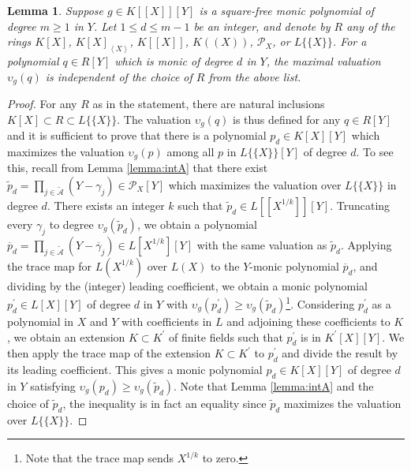\documentclass[a4paper,11pt]{amsart}%
\theoremstyle{definition}
\theoremstyle{plain}
\newtheorem{lemma}[defn]{Lemma}
\theoremstyle{remark}
\begin{document}
\begin{lemma}
\label{same exp} Suppose $g\in K[[X]][Y]$ is a square-free monic polynomial of degree
$m\geq 1$ in $Y$. Let $1\leq d \leq m-1$ be an integer, and denote by $R$ any of the rings $K[X]$,
$K[X]_{\left\langle X\right\rangle }$, $K[[X]]$, $K((X))$, ${\mathcal{P}_{X}}$, or $L\{\{X\}\}$.
For a polynomial $q\in R[Y]$ which is monic of degree $d$ in $Y$, the maximal valuation $\upsilon_{g}(q)$ is
independent of the choice of $R$ from the above list.
\end{lemma}
\begin{proof}
For any $R$ as in the statement, there are natural inclusions $K[X]\subset R \subset L\{\{X\}\}$.
The valuation $\upsilon_{g}(q)$  is thus defined for any $q\in R[Y]$ and it is sufficient to prove that
there is a polynomial $p_d\in K[X][Y]$ which maximizes the valuation $\upsilon_{g}(p)$ among all $p$ in $L\{\{X\}\}[Y]$
of degree $d$. To see this, recall from Lemma \ref{lemma:intA} that there exist 
$\widetilde{p}_d=\prod_{j\in\widetilde{\mathcal{A}}}(Y-\gamma_{j}) \in \mathcal{P}_{X}[Y]$
which maximizes the valuation over $L\{\{X\}\}$ in degree $d$. There exists an
integer $k$ such that $\widetilde{p}_d\in L[[X^{1/k}]][Y]$. Truncating every 
$\gamma_{j}$ to degree $\upsilon_{g}(\widetilde{p}_d)$, we obtain a polynomial $\overline
{p}_d = \prod_{j\in\widetilde{\mathcal{A}}}(Y-\overline{\gamma}_{j}) \in L[X^{1/k}][Y]$ with the same valuation as $\widetilde{p}_d$. 
Applying the trace map for
$L(X^{1/k})$ over $L(X)$ to the $Y$-monic polynomial $\overline{p}_d$,  and dividing by the (integer) leading coefficient, we obtain a monic polynomial $p_d^\prime\in L[X][Y]$ of degree $d$ in $Y$ with $\upsilon_{g}({p_{d}^\prime})
\geq  \upsilon_{g}(\widetilde{p}_d)$\footnote{Note that the trace map sends $X^{1/k}$ to zero.}.
Considering $p_d^\prime$ as a polynomial in $X$ and $Y$ with coefficients in $L$ and
adjoining these coefficients to $K$, we obtain an extension $K \subset K^\prime$ of finite fields such that
$p_d^\prime$ is in $K^\prime[X][Y]$. We then apply the trace map of the extension $K \subset K^\prime$ to $p_d^\prime$ and
divide the result by its leading coefficient. This gives a monic polynomial
$p_d\in K[X][Y]$ of degree $d$ in $Y$ satisfying $\upsilon_{g}({p_d}) \geq  \upsilon_{g}(\widetilde{p}_d)$.
Note that Lemma \ref{lemma:intA} and the choice of $\widetilde{p}_d$, the inequality is in fact an equality since
$\widetilde{p}_d$ maximizes the valuation over $L\{\{X\}\}$.
\end{proof}
\end{document}
